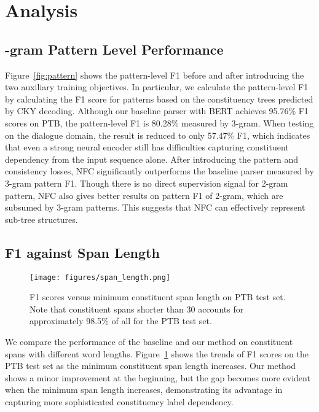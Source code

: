 \documentclass[11pt]{article}
\begin{document}
 








\section{Analysis}

\subsection{-gram Pattern Level Performance}


Figure~\ref{fig:pattern} shows the pattern-level F1 before and after introducing the two auxiliary training objectives. In particular, we calculate the pattern-level F1 by calculating the F1 score for patterns based on the constituency trees predicted by CKY decoding. Although our baseline parser with BERT achieves 95.76\% F1 scores on PTB, the pattern-level F1 is 80.28\% measured by 3-gram. When testing on the dialogue domain, the result is reduced to only 57.47\% F1, which indicates that even a strong neural encoder still has difficulties capturing constituent dependency from the input sequence alone. 
After introducing the pattern and consistency losses, NFC significantly outperforms the baseline parser measured by 3-gram pattern F1. 
Though there is no direct supervision signal for 2-gram pattern, NFC also gives better results on pattern F1 of 2-gram, which are subsumed by 3-gram patterns.
This suggests that NFC can effectively represent sub-tree structures.

\subsection{F1 against Span Length}

\begin{figure}[t!]
    \centering
    \texttt{[image: figures/span\_length.png]}
    \caption{F1 scores versus minimum constituent span length on PTB test set. Note that constituent spans shorter than 30 accounts for approximately 98.5\% of all for the PTB test set. }
    \label{fig:span_length}
    \vspace{-0.3cm}
\end{figure}

 


We compare the performance of the baseline and our method on constituent spans with different word lengths. 
Figure~\ref{fig:span_length} shows the trends of F1 scores on the PTB test set as the minimum constituent span length increases. 
Our method shows a minor improvement at the beginning, but the gap becomes more evident when the minimum span length increases, demonstrating its advantage in capturing
more sophisticated constituency label dependency.
\end{document}
